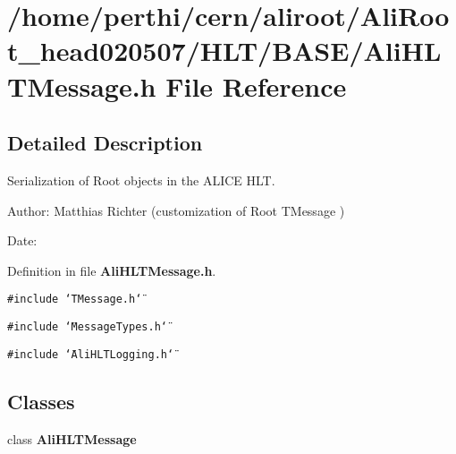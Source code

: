 \section{/home/perthi/cern/aliroot/Ali\-Root\_\-head020507/HLT/BASE/Ali\-HLTMessage.h File Reference}
\label{AliHLTMessage_8h}


\subsection{Detailed Description}
Serialization of Root objects in the ALICE HLT. 

\begin{Desc}
\item[Author:]Matthias Richter (customization of Root TMessage ) \end{Desc}
\begin{Desc}
\item[Date:]\end{Desc}


Definition in file {\bf Ali\-HLTMessage.h}.

{\tt \#include \char`\"{}TMessage.h\char`\"{}}\par
{\tt \#include \char`\"{}Message\-Types.h\char`\"{}}\par
{\tt \#include \char`\"{}Ali\-HLTLogging.h\char`\"{}}\par
\subsection*{Classes}
\begin{CompactItemize}
\item 
class {\bf Ali\-HLTMessage}
\end{CompactItemize}
